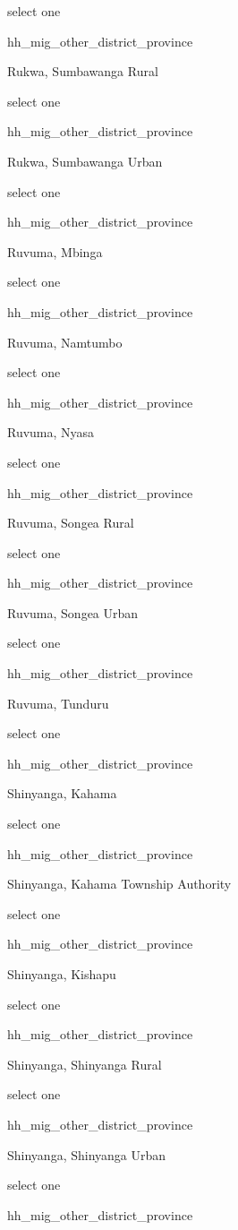 \documentclass[]{article}
\begin{document}
select one

hh\_mig\_other\_district\_province

Rukwa, Sumbawanga Rural

select one

hh\_mig\_other\_district\_province

Rukwa, Sumbawanga Urban

select one

hh\_mig\_other\_district\_province

Ruvuma, Mbinga

select one

hh\_mig\_other\_district\_province

Ruvuma, Namtumbo

select one

hh\_mig\_other\_district\_province

Ruvuma, Nyasa

select one

hh\_mig\_other\_district\_province

Ruvuma, Songea Rural

select one

hh\_mig\_other\_district\_province

Ruvuma, Songea Urban

select one

hh\_mig\_other\_district\_province

Ruvuma, Tunduru

select one

hh\_mig\_other\_district\_province

Shinyanga, Kahama

select one

hh\_mig\_other\_district\_province

Shinyanga, Kahama Township Authority

select one

hh\_mig\_other\_district\_province

Shinyanga, Kishapu

select one

hh\_mig\_other\_district\_province

Shinyanga, Shinyanga Rural

select one

hh\_mig\_other\_district\_province

Shinyanga, Shinyanga Urban

select one

hh\_mig\_other\_district\_province
\end{document}
